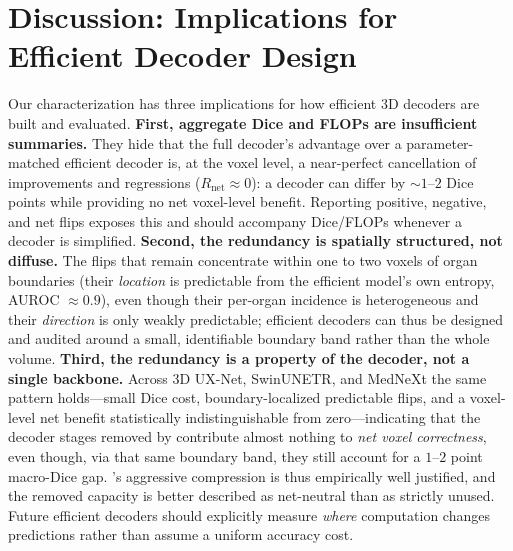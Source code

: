 \section{Discussion: Implications for Efficient Decoder Design}
\label{sec:discussion}

Our characterization has three implications for how efficient 3D decoders are built and
evaluated. \textbf{First, aggregate Dice and FLOPs are insufficient summaries.} They
hide that the full decoder's advantage over a parameter-matched efficient decoder is, at
the voxel level, a near-perfect cancellation of improvements and regressions
($R_{\mathrm{net}}\!\approx\!0$): a decoder can differ by $\sim\!1$--$2$ Dice points while
providing no net voxel-level benefit. Reporting positive, negative, and net flips exposes
this and should accompany Dice/FLOPs whenever a decoder is simplified.
\textbf{Second, the redundancy is spatially structured, not diffuse.} The flips that
remain concentrate within one to two voxels of organ boundaries (their \emph{location} is
predictable from the efficient model's own entropy, AUROC $\approx\!0.9$), even though
their per-organ incidence is heterogeneous and their \emph{direction} is only weakly
predictable; efficient decoders can thus be designed and audited around a small,
identifiable boundary band rather than the whole volume. \textbf{Third, the redundancy is a property of the decoder, not a
single backbone.} Across 3D UX-Net, SwinUNETR, and MedNeXt the same pattern holds---small
Dice cost, boundary-localized predictable flips, and a voxel-level net benefit
statistically indistinguishable from zero---indicating that the decoder stages removed by
\method{} contribute almost nothing to \emph{net voxel correctness}, even though, via that
same boundary band, they still account for a $1$--$2$ point macro-Dice gap. \method{}'s
aggressive compression is thus empirically well justified, and the removed capacity is
better described as net-neutral than as strictly unused. Future efficient decoders should
explicitly measure \emph{where} computation changes predictions rather than assume a
uniform accuracy cost.
